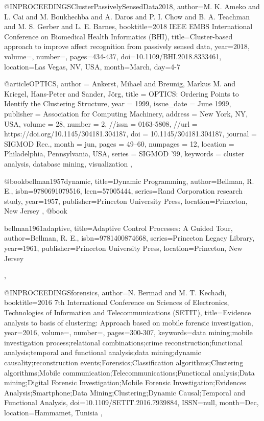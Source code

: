 @INPROCEEDINGS{ClusterPassivelySensedData2018,  
  author={M. K. {Ameko} and L. {Cai} and M. {Boukhechba} and A. {Daros} and P. I. {Chow} and B. A. {Teachman} and M. S. {Gerber} and L. E. {Barnes}},  
  booktitle={2018 IEEE EMBS International Conference on Biomedical Health Informatics (BHI)},  
  title={Cluster-based approach to improve affect recognition from passively sensed data},   
  year={2018},  
  volume={},  
  number={},  
  pages={434-437},
  doi={10.1109/BHI.2018.8333461},
  location={Las Vegas, NV, USA},
  month={March},
  day={4-7}
}

@article{OPTICS,
  author = {Ankerst, Mihael and Breunig, Markus M. and Kriegel, Hans-Peter and Sander, J\"{o}rg},
  title = {OPTICS: Ordering Points to Identify the Clustering Structure},
  year = {1999},
  issue_date = {June 1999},
  publisher = {Association for Computing Machinery},
  address = {New York, NY, USA},
  volume = {28},
  number = {2},
  //issn = {0163-5808},
  //url = {https://doi.org/10.1145/304181.304187},
  doi = {10.1145/304181.304187},
  journal = {SIGMOD Rec.},
  month = jun,
  pages = {49–60},
  numpages = {12},
  location = {Philadelphia, Pennsylvania, USA},
  series = {SIGMOD ’99},
  keywords = {cluster analysis, database mining, visualization}
},

@book{bellman1957dynamic,
  title={Dynamic Programming},
  author={Bellman, R. E.},
  isbn={9780691079516},
  lccn={57005444},
  series={Rand Corporation research study},
  year={1957},
  publisher={Princeton University Press},
  location={Princeton, New Jersey}
},
@book{bellman1961adaptive,
  title={Adaptive Control Processes: A Guided Tour},
  author={Bellman, R. E.},
  isbn={9781400874668},
  series={Princeton Legacy Library},
  year={1961},
  publisher={Princeton University Press},
  location={Princeton, New Jersey}

},

@INPROCEEDINGS{forensics, 
  author={N. {Bermad} and M. T. {Kechadi}}, 
  booktitle={2016 7th International Conference on Sciences of Electronics, Technologies of Information and Telecommunications (SETIT)}, 
  title={Evidence analysis to basis of clustering: Approach based on mobile forensic investigation}, 
  year={2016}, 
  volume={}, 
  number={}, 
  pages={300-307}, 
  keywords={data mining;mobile investigation process;relational combinations;crime reconstruction;functional analysis;temporal and functional analysis;data mining;dynamic causality;reconstruction events;Forensics;Classification algorithms;Clustering algorithms;Mobile communication;Telecommunications;Functional analysis;Data mining;Digital Forensic Investigation;Mobile Forensic Investigation;Evidences Analysis;Smartphone;Data Mining;Clustering;Dynamic Causal;Temporal and Functional Analysis}, 
  doi={10.1109/SETIT.2016.7939884}, 
  ISSN={null}, 
  month={Dec},
  location={Hammamet, Tunisia}
},

